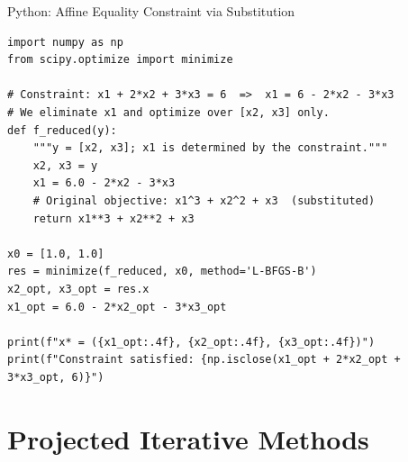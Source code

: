 \documentclass[aspectratio=169,10pt]{beamer}
\begin{document}
\begin{frame}[fragile]{Python: Affine Equality Constraint via Substitution}
  \begin{lstlisting}[style=pycode,caption={Minimize $x_1^3+x_2^2+x_3$ subject to $x_1+2x_2+3x_3=6$ by substitution}]
import numpy as np
from scipy.optimize import minimize

# Constraint: x1 + 2*x2 + 3*x3 = 6  =>  x1 = 6 - 2*x2 - 3*x3
# We eliminate x1 and optimize over [x2, x3] only.
def f_reduced(y):
    """y = [x2, x3]; x1 is determined by the constraint."""
    x2, x3 = y
    x1 = 6.0 - 2*x2 - 3*x3
    # Original objective: x1^3 + x2^2 + x3  (substituted)
    return x1**3 + x2**2 + x3

x0 = [1.0, 1.0]
res = minimize(f_reduced, x0, method='L-BFGS-B')
x2_opt, x3_opt = res.x
x1_opt = 6.0 - 2*x2_opt - 3*x3_opt

print(f"x* = ({x1_opt:.4f}, {x2_opt:.4f}, {x3_opt:.4f})")
print(f"Constraint satisfied: {np.isclose(x1_opt + 2*x2_opt + 3*x3_opt, 6)}")
  \end{lstlisting}
\end{frame}

\section{Projected Iterative Methods}
\end{document}
